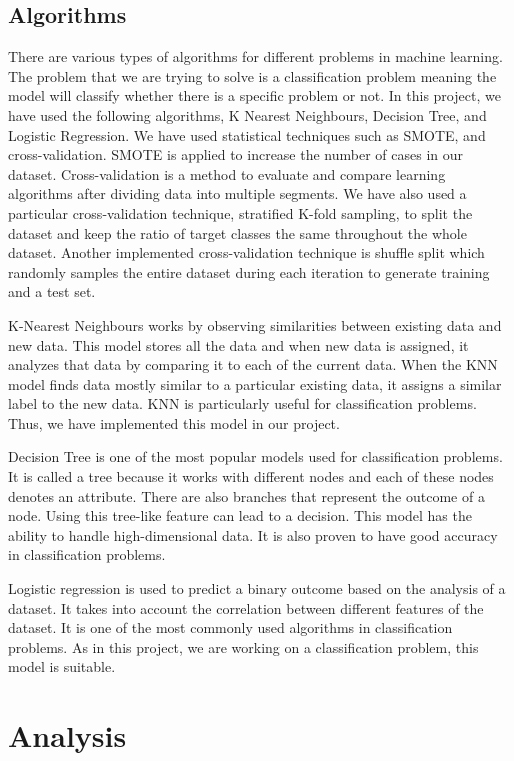 \documentclass[12pt, english]{article}
\begin{document}
\subsection{Algorithms}

There are various types of algorithms for different problems in machine learning. The problem that we are trying to solve is a classification problem meaning the model will classify whether there is a specific problem or not. In this project, we have used the following algorithms, K Nearest Neighbours, Decision Tree, and Logistic Regression. We have used statistical techniques such as SMOTE, and cross-validation. SMOTE is applied to increase the number of cases in our dataset. Cross-validation is a method to evaluate and compare learning algorithms after dividing data into multiple segments. We have also used a particular cross-validation technique, stratified K-fold sampling, to split the dataset and keep the ratio of target classes the same throughout the whole dataset. Another implemented cross-validation technique is shuffle split which randomly samples the entire dataset during each iteration to generate training and a test set. 

K-Nearest Neighbours works by observing similarities between existing data and new data. This model stores all the data and when new data is assigned, it analyzes that data by comparing it to each of the current data. When the KNN model finds data mostly similar to a particular existing data, it assigns a similar label to the new data. KNN is particularly useful for classification problems. Thus, we have implemented this model in our project.  

Decision Tree is one of the most popular models used for classification problems. It is called a tree because it works with different nodes and each of these nodes denotes an attribute. There are also branches that represent the outcome of a node. Using this tree-like feature can lead to a decision. This model has the ability to handle high-dimensional data. It is also proven to have good accuracy in classification problems. 

Logistic regression is used to predict a binary outcome based on the analysis of a dataset. It takes into account the correlation between different features of the dataset. It is one of the most commonly used algorithms in classification problems. As in this project, we are working on a classification problem, this model is suitable. 

\section{Analysis}
\end{document}
